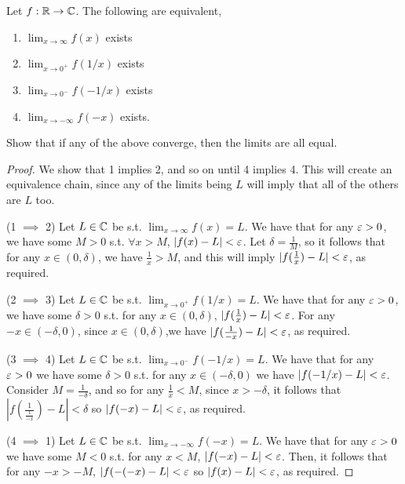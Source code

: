 \begin{exercise}
  Let $f:\mathbb R\to\mathbb C$. The following are equivalent,
  \begin{enumerate}
    \item $\lim_{x\to \infty} f(x)$ exists 
    \item $\lim_{x\to 0^+}f(1/x)$ exists
    \item $\lim_{x\to 0^-} f(-1/x)$ exists
    \item $\lim_{x\to -\infty} f(-x)$ exists.
  \end{enumerate}
  Show that if any of the above converge, then the limits are all equal.
\end{exercise}
\begin{proof}
  We show that 1 implies 2, and so on until 4 implies 4. This will create an equivalence
  chain, since any of the limits being $L$ will imply that all of the others are $L$ too. 

  (1 $\implies$ 2) Let $L\in\mathbb C$ be s.t. $\lim_{x\to \infty} f(x)=L$. We have that for any
  $\varepsilon>0$, we have some $M>0$ s.t. $\forall x>M$, $|f(x)-L|<\varepsilon$. Let
  $\delta=\frac{1}{M}$, so it follows that for any $x\in(0,\delta)$, we have
  $\frac{1}{x}>M$, and this will imply $|f(\frac{1}{x})-L|<\varepsilon$, as required.

  (2 $\implies$ 3) Let $L\in\mathbb C$ be s.t. $\lim_{x\to 0^{+}}f(1/x)=L$. We have that for any
  $\varepsilon>0$, we have some $\delta>0$ s.t. for any $x\in(0,\delta)$,
  $|f(\frac{1}{x})-L|<\varepsilon$. For any $-x\in (-\delta,0)$, since $x\in (0,\delta)$,we have
  $|f(\frac{1}{-x})-L|<\varepsilon$, as required.

  (3 $\implies$ 4) Let $L\in\mathbb C$ be s.t. $\lim_{x\to0^-}f(-1/x)=L$. We have that for any
  $\varepsilon>0$ we have some $\delta>0$ s.t. for any $x\in (-\delta, 0)$ we have
  $|f(-1/x)-L|<\varepsilon$. Consider $M=\frac{1}{-\delta}$, and so for any
  $\frac{1}{x}<M$, since $x>-\delta$, it follows that
  $|f(\frac{1}{\frac{1}{-x}})-L|<\delta$ so $|f(-x)-L|<\varepsilon$, as required.

  (4 $\implies$ 1) Let $L\in\mathbb C$ be s.t. $\lim_{x\to -\infty} f(-x)=L$. We have that for
  any $\varepsilon>0$ we have some $M<0$ s.t. for any $x<M$, $|f(-x)-L|<\varepsilon$. Then, it follows
  that for any $-x>-M$, $|f(-(-x)-L|<\varepsilon$ so $|f(x)-L|<\varepsilon$, as required.
\end{proof}


